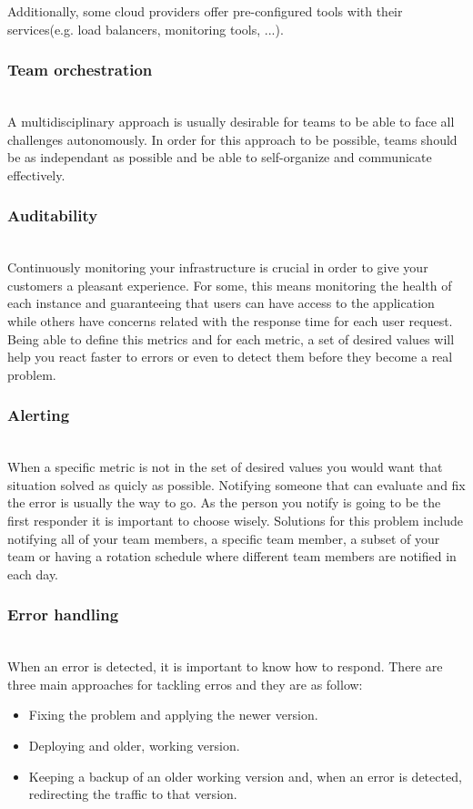 \documentclass{llncs}
\begin{document}
    Additionally, some cloud providers offer pre-configured tools with their services(e.g. load balancers, monitoring tools, ...).
    \subsubsection{Team orchestration}~\\

    A multidisciplinary approach is usually desirable for teams to be able to face all challenges autonomously. In order for this approach to be possible, teams should be as independant as possible and be able to self-organize and communicate effectively.
    \subsubsection{Auditability}~\\
    Continuously monitoring your infrastructure is crucial in order to give your customers a pleasant experience. For some, this means monitoring the health of each instance and guaranteeing that users can have access to the application while others have concerns related with the response time for each user request. Being able to define this metrics and for each metric, a set of desired values will help you react faster to errors or even to detect them before they become a real problem.
    \subsubsection{Alerting}~\\
    When a specific metric is not in the set of desired values you would want that situation solved as quicly as possible. Notifying someone that can evaluate and fix the error is usually the way to go. As the person you notify is going to be the first responder it is important to choose wisely.
    Solutions for this problem include notifying all of your team members, a specific team member, a subset of your team or having a rotation schedule where different team members are notified in each day.
    \subsubsection{Error handling}~\\
    When an error is detected, it is important to know how to respond. There are three main approaches for tackling erros and they are as follow:
    \begin{itemize}
      \item Fixing the problem and applying the newer version.
      \item Deploying and older, working version.
      \item Keeping a backup of an older working version and, when an error is detected, redirecting the traffic to that version.
    \end{itemize}
\end{document}
